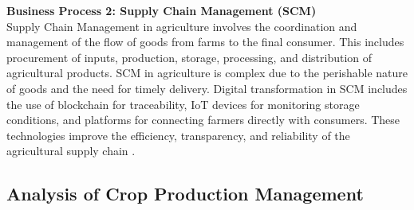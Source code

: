 \documentclass[12pt,a4paper]{article}
\begin{document}
\noindent \textbf{Business Process 2: Supply Chain Management (SCM)}\\Supply Chain Management in agriculture involves the coordination and management of the flow of goods from farms to the final consumer. This includes procurement of inputs, production, storage, processing, and distribution of agricultural products. SCM in agriculture is complex due to the perishable nature of goods and the need for timely delivery. Digital transformation in SCM includes the use of blockchain for traceability, IoT devices for monitoring storage conditions, and platforms for connecting farmers directly with consumers. These technologies improve the efficiency, transparency, and reliability of the agricultural supply chain \citep{Ref_6}.

\subsection{Analysis of Crop Production Management}
\label{sec:Task 2_B}
\end{document}
